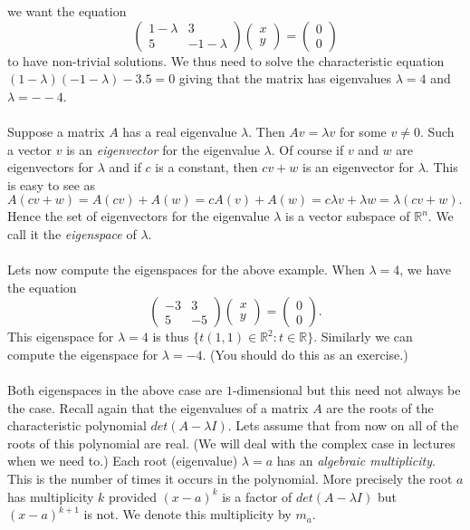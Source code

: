 \documentclass{amsart}
\begin{document}
we want the equation 
\begin{equation*}
 \begin{pmatrix}
1-\lambda&3\\
 5&-1-\lambda
 \end{pmatrix}
\begin{pmatrix}
x\\
y
\end{pmatrix}
=
\begin{pmatrix}
0\\
0
\end{pmatrix}
\end{equation*}
to have non-trivial solutions. We thus need to solve the characteristic equation $(1-\lambda)(-1-\lambda)-3.5=0$ giving that the matrix has eigenvalues $\lambda=4$ and $\lambda=--4$.
\\\\
Suppose a matrix $A$ has a real eigenvalue $\lambda$. Then $Av=\lambda v$ for some $v\neq0$. Such a vector $v$ is an {\it eigenvector} for the eigenvalue $\lambda$. Of course if $v$ and $w$ are eigenvectors for $\lambda$ and if $c$ is a constant, then $cv+w$ is an eigenvector for $\lambda$. This is easy to see as $A(cv+w)=A(cv)+A(w)=cA(v)+A(w)=c\lambda v+\lambda w=\lambda(cv+w).$ Hence the set of eigenvectors for the eigenvalue $\lambda$ is a vector subspace of $\mathbb{R}^{n}$. We call it the {\it eigenspace} of $\lambda$.\\\\
Lets now compute the eigenspaces for the above example. When $\lambda=4$, we have the equation\\
\begin{equation*}
 \begin{pmatrix}
-3&3\\
 5&-5
 \end{pmatrix}
\begin{pmatrix}
x\\
y
\end{pmatrix}
=
\begin{pmatrix}
0\\
0
\end{pmatrix}.
\end{equation*}
This eigenspace for $\lambda=4$ is thus $\{t(1,1)\in\mathbb{R}^{2}:t\in\mathbb{R}\}$. Similarly we can compute the eigenspace for $\lambda=-4$. (You should do this as an exercise.) \\
\\
Both eigenspaces in the above case are $1$-dimensional but this need not always be the case. Recall again that the eigenvalues of a matrix $A$ are the roots of the characteristic polynomial $det(A-\lambda I)$. Lets assume that from now on all of the roots of this polynomial are real. (We will deal with the complex case in lectures when we need to.) Each root (eigenvalue) $\lambda=a$ has an {\it algebraic multiplicity}. This is the number of times it occurs in the polynomial. More precisely the root $a$ has multiplicity $k$ provided $(x-a)^{k}$ is a factor of $det(A-\lambda I)$ but $(x-a)^{k+1}$ is not. We denote this multiplicity by $m_{a}$.\\
\end{document}
